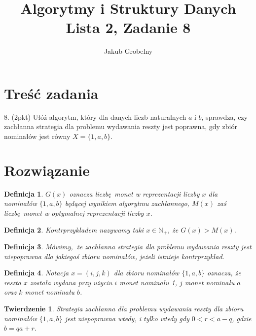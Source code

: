 \documentclass[12pt]{article}
\title{\bfseries Algorytmy i Struktury Danych\\\Large Lista 2, Zadanie 8}
\date{}
\author{\large Jakub Grobelny}
\newtheorem*{theorem*}{Twierdzenie}
\newtheorem*{definition*}{Definicja}
\begin{document}
\begin{titlepage}
\maketitle
\thispagestyle{empty}

\section{Treść zadania}

8. (2pkt) Ułóż algorytm, który dla danych liczb naturalnych $a$ i $b$, sprawdza,
czy zachłanna strategia dla problemu wydawania reszty jest poprawna, gdy zbiór
nominałów jest równy $X = \{1, a, b\}$.

\section{Rozwiązanie}

\begin{definition*}
\normalfont
$G(x)$ oznacza liczbę monet w reprezentacji liczby $x$ dla nominałów $\{1, a, b\}$ 
będącej wynikiem algorytmu zachłannego, $M(x)$ zaś liczbę monet w optymalnej
reprezentacji liczby $x$.
\end{definition*}

\begin{definition*}
\normalfont
Kontrprzykładem nazywamy taki $x \in \mathds{N_+}$, że $G(x) > M(x)$.
\end{definition*}
    
\begin{definition*}
\normalfont
Mówimy, że zachłanna strategia dla problemu wydawania reszty jest niepoprawna dla
jakiegoś zbioru nominałów, jeżeli istnieje kontrprzykład.
\end{definition*}


\begin{definition*}
\normalfont
Notacja $x = (i, j, k)$ dla zbioru nominałów $\{1, a, b\}$ oznacza, że reszta $x$ została wydana przy użyciu $i$
monet nominału 1, $j$ monet nominału $a$ oraz $k$ monet nominału $b$.
\end{definition*}

\begin{theorem*}\normalfont
Strategia zachłanna dla problemu wydawania reszty dla zbioru nominałów 
$\{1, a, b\}$ jest niepoprawna wtedy, i tylko wtedy gdy $0 < r < a - q$,
gdzie $b = qa + r$.
\end{theorem*}



\end{titlepage}
\end{document}

